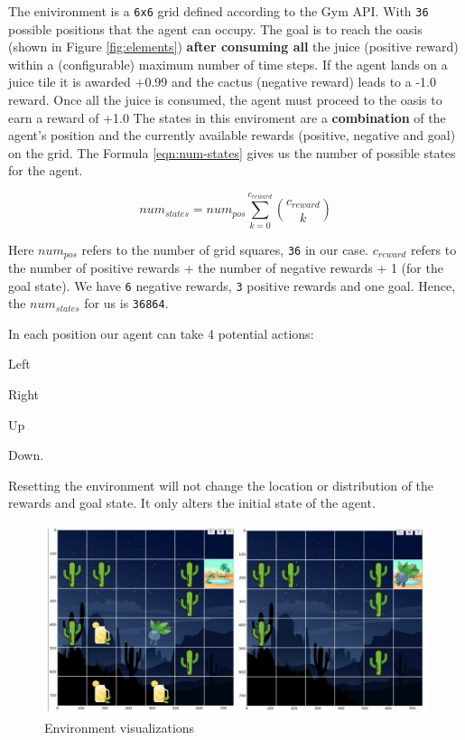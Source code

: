 \documentclass{article} %
\begin{document}
The enivironment is a \verb|6x6| grid defined according to the Gym \cite{1606.01540} API.
With \verb|36| possible positions that the agent can
occupy. The goal is to reach the oasis (shown in Figure \ref{fig:elements}) \textbf{after
consuming all} the juice (positive reward) within a (configurable) maximum number of time
steps. If the agent lands on a juice tile it is awarded +0.99 and the cactus (negative
reward) leads to a -1.0 reward. Once all the juice is consumed, the agent must proceed to the
oasis to earn a reward of +1.0
The states in this enviroment are a \textbf{combination} of the agent's position and the
currently available rewards (positive, negative and goal) on the grid. The Formula
\ref{eqn:num-states} gives us the number of possible states for the agent.

\begin{equation}
    num_{states}=num_{pos} \sum_{k=0}^{c_{reward}} {c_{reward}\choose k}
    \label{eqn:num-states}
\end{equation}

Here $num_{pos}$ refers to the number of grid squares, \verb|36| in our case. $c_{reward}$
refers to the number of positive rewards + the number of negative rewards + 1 (for the goal
state). We have \verb|6| negative rewards, \verb|3| positive rewards and one goal. Hence, 
the $num_{states}$ for us is \verb|36864|.

In each position our agent can take 4 potential actions:
\begin{enumerate*}
    \item Left
    \item Right
    \item Up
    \item Down.
\end{enumerate*}
Resetting the environment will not change the location or distribution of the rewards and
goal state. It only alters the initial state of the agent.

\begin{figure}[h]
    \begin{center}
        \includegraphics[scale=0.50]{vis.png}
    \end{center}
    \caption{Environment visualizations}
\end{figure}
\end{document}
